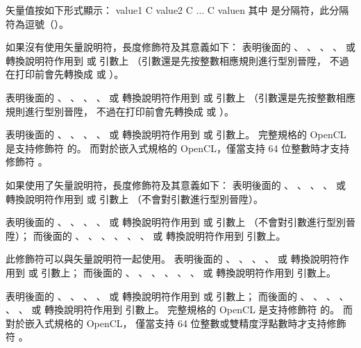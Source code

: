 矢量值按如下形式顯示：
\startclc[indentnext=no]
value1 C value2 C ... C valuen
\stopclc
其中  是分隔符，此分隔符為逗號（\ccmm{,}）。
\stopclSpecifier

如果沒有使用矢量說明符，長度修飾符及其意義如下：
表明後面的 、 、 、 、
  或  轉換說明符作用到  或  引數上
（引數還是先按整數相應規則進行型別晉陞，
不過在打印前會先轉換成  或 ）。
\stopclSpecifier

表明後面的 、 、 、 、
  或  轉換說明符作用到  或  引數上
（引數還是先按整數相應規則進行型別晉陞，
不過在打印前會先轉換成  或 ）。
\stopclSpecifier

表明後面的 、 、 、 、
  或  轉換說明符作用到  或  引數上。
完整規格的 OpenCL 是支持修飾符  的。
而對於嵌入式規格的 OpenCL，僅當支持 64 位整數時才支持修飾符 。
\stopclSpecifier

如果使用了矢量說明符，長度修飾符及其意義如下：
表明後面的 、 、 、 、  或 
 轉換說明符作用到  或  引數上
（不會對引數進行型別晉陞）。
\stopclSpecifier

表明後面的 、 、 、 、  或 
 轉換說明符作用到  或  引數上
（不會對引數進行型別晉陞）；
而後面的 、 、 、 、 、 、
  或  轉換說明符作用到  引數上。
\stopclSpecifier

此修飾符可以與矢量說明符一起使用。
表明後面的 、 、 、 、  或 
 轉換說明符作用到  或  引數上；
而後面的 、 、 、 、 、 、
  或  轉換說明符作用到  引數上。
\stopclSpecifier

表明後面的 、 、 、 、  或 
 轉換說明符作用到  或  引數上；
而後面的 、 、 、 、 、 、
  或  轉換說明符作用到  引數上。
完整規格的 OpenCL 是支持修飾符  的。
而對於嵌入式規格的 OpenCL，
僅當支持 64 位整數或雙精度浮點數時才支持修飾符 。
\stopclSpecifier

